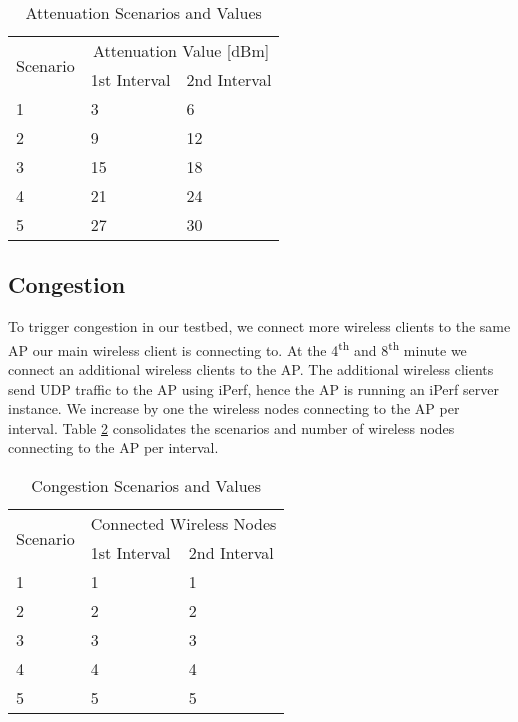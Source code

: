 \begin{table}[h!]
	\begin{center}
		\begin{tabular}{|| m{5em} | m{2cm}| m{2cm} ||}
			\hline
			\multirow{2}{*}{Scenario} & \multicolumn{2}{c||}{Attenuation Value {[}dBm{]}} \\ \cline{2-3} 
			& \multicolumn{1}{l|}{1st Interval} & \multicolumn{1}{l||}{2nd Interval} \\ \hline\hline
			1 & 3 & 6 \\ \hline
			2 & 9 & 12 \\ \hline
			3 & 15 & 18 \\ \hline
			4 & 21 & 24 \\ \hline
			5 & 27 & 30 \\ \hline
		\end{tabular}
	\end{center}
	\caption{Attenuation Scenarios and Values}
	\label{table:Attenuation_Experiment_Values}
\end{table}

\subsection*{Congestion}

To trigger congestion in our testbed, we connect more wireless clients to the same AP our main wireless client is connecting to. At the 4\textsuperscript{th} and 8\textsuperscript{th} minute we connect an additional wireless clients to the AP. The additional wireless clients send UDP traffic to the AP using iPerf, hence the AP is running an iPerf server instance. We increase by one the wireless nodes connecting to the AP per interval. Table \ref{table:Congestion_Experiment_Values} consolidates the scenarios and number of wireless nodes connecting to the AP per interval.

\begin{table}[h!]
	\begin{center}
		\begin{tabular}{|| m{5em} | m{2cm}| m{2cm} ||}
			\hline
			\multirow{2}{*}{Scenario} & \multicolumn{2}{l||}{Connected Wireless Nodes} \\ \cline{2-3} 
			& \multicolumn{1}{l|}{1st Interval} & \multicolumn{1}{l||}{2nd Interval} \\ \hline\hline
			1 & 1 & 1 \\ \hline
			2 & 2 & 2 \\ \hline
			3 & 3 & 3 \\ \hline
			4 & 4 & 4 \\ \hline
			5 & 5 & 5 \\ \hline
		\end{tabular}
	\end{center}
	\caption{Congestion Scenarios and Values}
	\label{table:Congestion_Experiment_Values}
\end{table}

